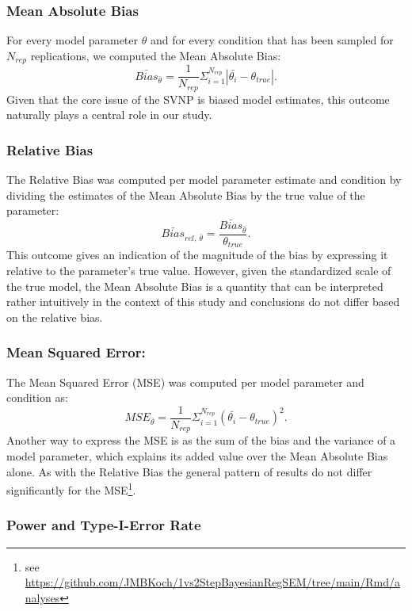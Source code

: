 \documentclass[
  man, donotrepeattitle,floatsintext]{apa6}
\begin{document}
\hypertarget{mean-absolute-bias}{%
\subsubsection{Mean Absolute Bias}\label{mean-absolute-bias}}

For every model parameter \(\theta\) and for every condition that has been
sampled for \(N_{rep}\) replications, we computed the Mean Absolute Bias:
\[\bar{Bias}_{\bar{\theta}} = \frac{1}{N_{rep}} \Sigma_{i = 1}^{N_{rep}} |\bar{\theta_i} - \theta_{true}|.\]
Given that the core issue of the SVNP is biased model estimates, this
outcome naturally plays a central role in our study.

\hypertarget{relative-bias}{%
\subsubsection{Relative Bias}\label{relative-bias}}

The Relative Bias was computed per model parameter estimate and
condition by dividing the estimates of the Mean Absolute Bias by the
true value of the parameter:
\[\bar{Bias}_{rel, \ \bar{\theta} } = \frac{\bar{Bias}_{\bar{\theta}}}{\theta_{true} }.\]
This outcome gives an indication of the magnitude of the bias by
expressing it relative to the parameter's true value. However, given the
standardized scale of the true model, the Mean Absolute Bias is a
quantity that can be interpreted rather intuitively in the context of
this study and conclusions do not differ based on the relative bias.

\hypertarget{mean-squared-error}{%
\subsubsection{Mean Squared Error:}\label{mean-squared-error}}

The Mean Squared Error (MSE) was computed per model parameter and
condition as:
\[MSE_{\bar{\theta}} = \frac{1}{N_{rep}} \Sigma_{i = 1}^{N_{rep}} (\bar{\theta_i} - \theta_{true})^2.\]
Another way to express the MSE is as the sum of the bias and the
variance of a model parameter, which explains its added value over the
Mean Absolute Bias alone. As with the Relative Bias the general pattern
of results do not differ significantly for the MSE\footnote{see
  \url{https://github.com/JMBKoch/1vs2StepBayesianRegSEM/tree/main/Rmd/analyses}}.

\hypertarget{power-and-type-i-error-rate}{%
\subsubsection{Power and Type-I-Error Rate}\label{power-and-type-i-error-rate}}
\end{document}
